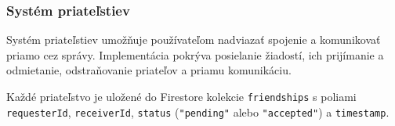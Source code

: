 \subsubsection{Systém priateľstiev} 
                                                                                          
  Systém priateľstiev umožňuje používateľom nadviazať spojenie a komunikovať
  priamo cez správy. Implementácia pokrýva posielanie žiadostí, ich
  prijímanie a odmietanie, odstraňovanie priateľov a priamu komunikáciu.

  Každé priateľstvo je uložené do Firestore kolekcie \texttt{friendships}
  s poliami \texttt{requesterId}, \texttt{receiverId}, \texttt{status}
  (\texttt{"pending"} alebo \texttt{"accepted"}) a \texttt{timestamp}.

